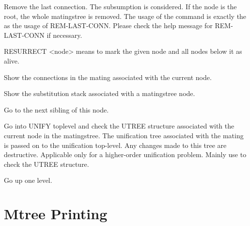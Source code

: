 \begin{description}
\item[REM-NODE]  
Remove the last connection. The subsumption is considered.
If the node is the root, the whole matingstree is removed. The 
usage of the command is exactly the as the usage of REM-LAST-CONN. 
Please check the help message for REM-LAST-CONN if necessary.

\item[RESURRECT]  
RESURRECT <node> means to mark the given node and 
all nodes below it as alive.

\item[SHOW-MATING]  
Show the connections in the mating associated with the current node.

\item[SHOW-SUBSTS]  
Show the substitution stack associated with a matingstree node.

\item[SIB]  
Go to the next sibling of this node.

\item[UNIFY]  
Go into UNIFY toplevel and check the UTREE structure
associated with the current node in the matingstree. The 
unification tree associated with the mating is passed on 
to the unification top-level. Any changes made to this tree 
are destructive. Applicable only for a higher-order unification 
problem. Mainly use to check the UTREE structure.

\item[UP]  
Go up one level.
\item
\end{description}

\section{Mtree Printing}

